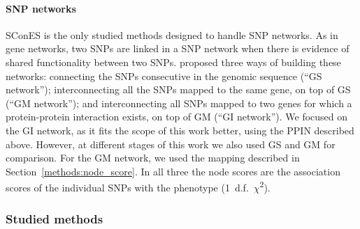 \documentclass[twocolumn, 11pt]{article}
\begin{document}
\paragraph{SNP networks}
SConES \cite{azencott_efficient_2013} is the only studied methods designed to handle SNP networks. As in gene networks, two SNPs are linked in a SNP network when there is evidence of shared functionality between two SNPs. \citet{azencott_efficient_2013} proposed three ways of building these networks: connecting the SNPs consecutive in the genomic sequence (``GS network''); interconnecting all the SNPs mapped to the same gene, on top of GS (``GM network''); and interconnecting all SNPs mapped to two genes for which a protein-protein interaction exists, on top of GM (``GI network''). We focused on the GI network, as it fits the scope of this work better, using the PPIN described above. However, at different stages of this work we also used GS and GM for comparison. For the GM network, we used the mapping described in Section~\ref{methods:node_score}. In all three the node scores are the association scores of the individual SNPs with the phenotype (1~d.f.~\(\chi\)\textsuperscript{2}).

\subsubsection{Studied methods}
\label{methods:methods}
\end{document}
